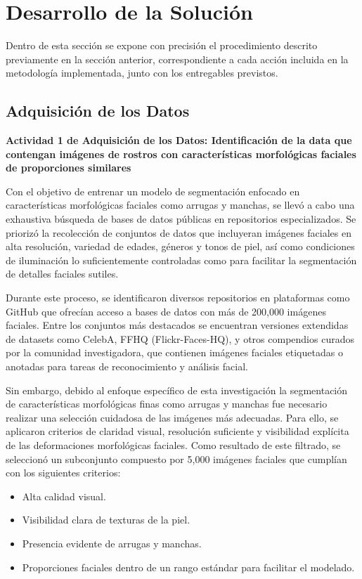 \chapter{Desarrollo de la Solución}
Dentro de esta sección se expone con precisión el procedimiento descrito previamente en la sección anterior, correspondiente a cada acción incluida en la metodología implementada, junto con los entregables previstos.

\section{Adquisición de los Datos}

\textbf{Actividad 1 de Adquisición de los Datos: Identificación de la data que contengan imágenes de rostros con características morfológicas faciales de proporciones similares}
 
Con el objetivo de entrenar un modelo de segmentación enfocado en características morfológicas faciales como arrugas y manchas, se llevó a cabo una exhaustiva búsqueda de bases de datos públicas en repositorios especializados. Se priorizó la recolección de conjuntos de datos que incluyeran imágenes faciales en alta resolución, variedad de edades, géneros y tonos de piel, así como condiciones de iluminación lo suficientemente controladas como para facilitar la segmentación de detalles faciales sutiles.

Durante este proceso, se identificaron diversos repositorios en plataformas como GitHub que ofrecían acceso a bases de datos con más de 200,000 imágenes faciales. Entre los conjuntos más destacados se encuentran versiones extendidas de datasets como CelebA, FFHQ (Flickr-Faces-HQ), y otros compendios curados por la comunidad investigadora, que contienen imágenes faciales etiquetadas o anotadas para tareas de reconocimiento y análisis facial.

Sin embargo, debido al enfoque específico de esta investigación la segmentación de características morfológicas finas como arrugas y manchas fue necesario realizar una selección cuidadosa de las imágenes más adecuadas. Para ello, se aplicaron criterios de claridad visual, resolución suficiente y visibilidad explícita de las deformaciones morfológicas faciales. Como resultado de este filtrado, se seleccionó un subconjunto compuesto por 5,000 imágenes faciales que cumplían con los siguientes criterios:

\begin{itemize}
    \item Alta calidad visual.   
    \item Visibilidad clara de texturas de la piel.
    \item Presencia evidente de arrugas y manchas.
    \item Proporciones faciales dentro de un rango estándar para facilitar el modelado.
\end{itemize} 

